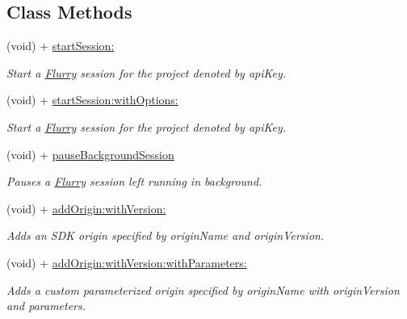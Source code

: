 \subsection*{Class Methods}
\begin{DoxyCompactItemize}
\item 
(void) + \hyperlink{interfaceFlurry_aeadfa23545c392ffd46db448b6a95809}{start\+Session\+:}
\begin{DoxyCompactList}\small\item\em Start a \hyperlink{interfaceFlurry}{Flurry} session for the project denoted by {\ttfamily api\+Key}. \end{DoxyCompactList}\item 
(void) + \hyperlink{interfaceFlurry_a31b4253cab9e640a2c8815930211ff9f}{start\+Session\+:with\+Options\+:}
\begin{DoxyCompactList}\small\item\em Start a \hyperlink{interfaceFlurry}{Flurry} session for the project denoted by {\ttfamily api\+Key}. \end{DoxyCompactList}\item 
(void) + \hyperlink{interfaceFlurry_a57e18dc7c992272e3dc89e7f3bc853f4}{pause\+Background\+Session}
\begin{DoxyCompactList}\small\item\em Pauses a \hyperlink{interfaceFlurry}{Flurry} session left running in background. \end{DoxyCompactList}\item 
(void) + \hyperlink{interfaceFlurry_a8868284f7deee30fdf767fa9cae4f66d}{add\+Origin\+:with\+Version\+:}
\begin{DoxyCompactList}\small\item\em Adds an S\+DK origin specified by {\ttfamily origin\+Name} and {\ttfamily origin\+Version}. \end{DoxyCompactList}\item 
(void) + \hyperlink{interfaceFlurry_a7c107ebf08e647b5fbe70920e3b31c57}{add\+Origin\+:with\+Version\+:with\+Parameters\+:}
\begin{DoxyCompactList}\small\item\em Adds a custom parameterized origin specified by {\ttfamily origin\+Name} with {\ttfamily origin\+Version} and {\ttfamily parameters}. \end{DoxyCompactList}\end{DoxyCompactItemize}
